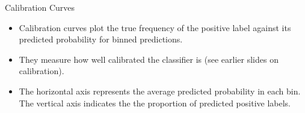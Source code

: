 \documentclass[11pt,compress,t,notes=noshow, aspectratio=169, xcolor=table]{beamer}
\begin{document}
\begin{frame}{Calibration Curves}

\begin{itemize}
\setlength\itemsep{2em}
    \item Calibration curves plot the true frequency of the positive label against its predicted probability for binned predictions.
    \item They measure how well calibrated the classifier is (see earlier slides on calibration).
    \item The horizontal axis represents the average predicted probability in each bin. The vertical axis indicates the the proportion of predicted positive labels.
\end{itemize}
\end{frame}


\endlecture
\end{document}
